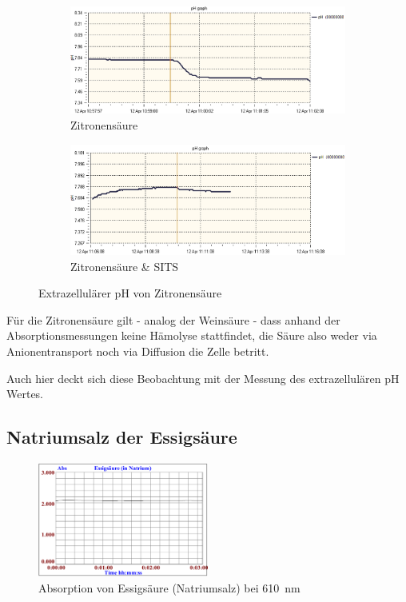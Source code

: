 \documentclass[a4paper,german]{scrreprt}
\begin{document}
\begin{figure}
	\centering
	\begin{subfigure}{.5\textwidth}
		\centering
		\includegraphics[width=\linewidth]{img/ph_citric.png}
		\caption{Zitronensäure}
	\end{subfigure}%
	\begin{subfigure}{.5\textwidth}
		\centering
		\includegraphics[width=\linewidth]{img/ph_citric_sits.png}
		\caption{Zitronensäure \& SITS}
	\end{subfigure}
	\caption{Extrazellulärer pH von Zitronensäure}
	\label{fig:ph_citric}
\end{figure}

Für die Zitronensäure gilt - analog der Weinsäure - dass anhand der
Absorptionsmessungen keine Hämolyse stattfindet, die Säure also weder via
Anionentransport noch via Diffusion die Zelle betritt.

Auch hier deckt sich diese Beobachtung mit der Messung des extrazellulären pH
Wertes.

\subsection{Natriumsalz der Essigsäure}

\begin{figure}[h]
	\centering
	\includegraphics[width=0.5\textwidth]{img/haem_essig_na}
	\caption{Absorption von Essigsäure (Natriumsalz) bei \SI{610}{nm}}
	\label{fig:haem_essig_na}
\end{figure}
\end{document}
